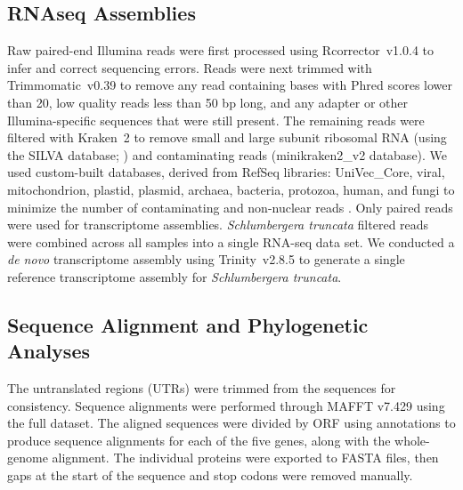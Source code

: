 \documentclass[fleqn,10pt,lineno]{wlpeerj}
\begin{document}
\subsection*{RNAseq Assemblies}

Raw paired-end Illumina reads were first processed using \mbox{Rcorrector}~v1.0.4 \citep{song2015} to infer and correct sequencing errors.
Reads were next trimmed with \mbox{Trimmomatic}~v0.39 \citep{bolger2014} to remove any read containing bases with Phred scores lower than 20, low quality reads less than 50 bp long, and any adapter or other Illumina-specific sequences that were still present.
The remaining reads were filtered with \mbox{Kraken}~2 \citep{wood2019} to remove small and large subunit ribosomal RNA (using the SILVA database; \citealt{quast2013}) and contaminating reads (minikraken2\_v2 database).
We used custom-built databases, derived from RefSeq libraries: UniVec\_Core, viral, mitochondrion, plastid, plasmid, archaea, bacteria, protozoa, human, and fungi to minimize the number of contaminating and non-nuclear reads \citep{ramanauskas2021}.
Only paired reads were used for transcriptome assemblies.
\textit{Schlumbergera truncata} filtered reads were combined across all samples into a single RNA-seq data set.
We conducted a \textit{de novo} transcriptome assembly using \mbox{Trinity}~v2.8.5 \citep{grabherr2011} 
to generate a single reference transcriptome assembly for \textit{Schlumbergera truncata}.

\subsection*{Sequence Alignment and Phylogenetic Analyses}
The untranslated regions (UTRs) were trimmed from the sequences for consistency.
Sequence alignments were performed through MAFFT v7.429 \citep{katoh_mafft_2002} using the full dataset.
The aligned sequences were divided by ORF using annotations to produce sequence alignments for each of the five genes, along with the whole-genome alignment. 
The individual proteins were exported to FASTA files, then gaps at the start of the sequence and stop codons were removed manually. 
\end{document}
